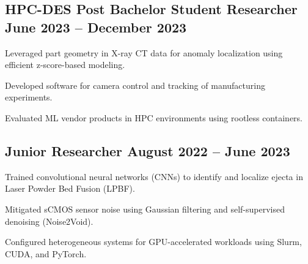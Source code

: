 \subsection{{HPC-DES Post Bachelor Student Researcher \hfill June 2023 -- December 2023}}
\begin{zitemize}
    \item Leveraged part geometry in X-ray CT data for anomaly localization
          using efficient z-score-based modeling.
    \item Developed software for camera control and tracking of manufacturing
          experiments.
    \item Evaluated ML vendor products in HPC environments using rootless
          containers.
\end{zitemize}

\subsection{{Junior Researcher \hfill August 2022 -- June 2023}}
\begin{zitemize}

    \item Trained convolutional neural networks (CNNs) to identify and localize
          ejecta in Laser Powder Bed Fusion (LPBF).
    \item Mitigated sCMOS sensor noise using Gaussian filtering and
          self-supervised denoising (Noise2Void).
    \item Configured heterogeneous systems for GPU-accelerated workloads using
          Slurm, CUDA, and PyTorch.
\end{zitemize}

